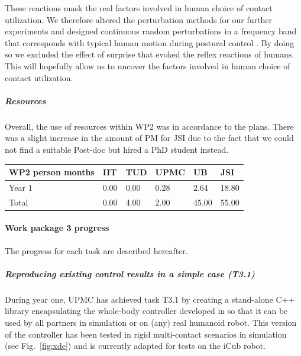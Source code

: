 \documentclass[12pt,a4paper,twoside]{article}
\begin{document}
These reactions mask the real factors involved in human choice of contact utilization. We therefore altered the perturbation methods for our further experiments and designed continuous random perturbations in a frequency band that corresponds with typical human motion during postural control \cite{Nawayseh2006}. By doing so we excluded the effect of surprise that evoked the reflex reactions of humans. This will hopefully allow us to uncover the factors involved in human choice of contact utilization.

\subparagraph{Resources}
Overall, the use of resources within WP2 was in accordance to the plans. There was a slight increase in the amount of PM for JSI due to the fact that we could not find a suitable Post-doc but hired a PhD student instead.

\begin{center}
\begin{tabular}{|C{1.5cm}|C{1.5cm}|C{1.5cm}|C{2cm}|C{2cm}|C{2cm}|}
\hline
\footnotesize \textbf{WP2 person months}& \footnotesize \textbf{IIT}&\footnotesize \textbf{TUD}&\footnotesize \textbf{UPMC}& \footnotesize \textbf{UB} &\footnotesize \textbf{JSI}\\ \hline
\footnotesize Year 1 &     0.00& 0.00 & 0.28 & 2.64 & 18.80   \\  \hline
\footnotesize Total &  0.00	 & 4.00 & 2.00 & 45.00 & 55.00 \\ \hline
\end{tabular}
\end{center}

\paragraph{Work package 3 progress}

The progress for each task are described hereafter.

\subparagraph{Reproducing existing control results in a simple case (T3.1)}
During year one, UPMC has achieved task T3.1 by creating a stand-alone C++ library encapsulating the whole-body controller developed in \cite{salini2012} so that it can be used by all partners in simulation or on (any) real humanoid robot. This version of the controller has been tested in rigid multi-contact scenarios in simulation (see Fig.~\ref{fig:xde}) and is currently adapted for tests on the iCub robot.
\end{document}
